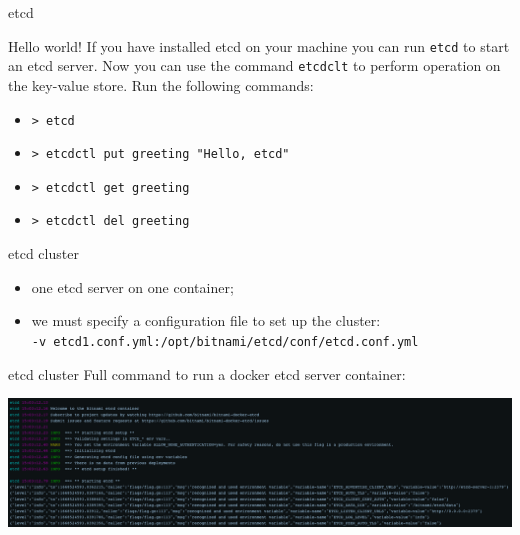 \documentclass[presentation]{beamer}\mode<presentation>{\usetheme{AMSBolognaFC}}
\begin{document}
\begin{frame}[allowframebreaks]{etcd}
    \framebreak
    
    \begin{block}{Hello world!}
        If you have installed etcd on your machine you can run \texttt{etcd} to start an etcd server.
        Now you can use the command \texttt{etcdclt} to perform operation on the key-value store.
        Run the following commands:
        \begin{itemize}
            \item \texttt{> etcd}
            \item \texttt{> etcdctl put greeting "Hello, etcd"}
            \item \texttt{> etcdctl get greeting}
            \item \texttt{> etcdctl del greeting}
        \end{itemize}
    \end{block}
    
    \framebreak
    
    \begin{block}{etcd cluster}
        \begin{itemize}
            \item one etcd server on one container;
            \item we must specify a configuration file to set up the cluster:\\
            \texttt{-v etcd1.conf.yml:/opt/bitnami/etcd/conf/etcd.conf.yml}
        \end{itemize}
        
    \end{block}
    
    \framebreak
    
    \begin{block}{etcd cluster}
        Full command to run a docker etcd server container:\\
        
    \end{block}
    
    \centering
    \includegraphics[width=\textwidth]{figures/docker-run-output.png}
    
\end{frame}
\end{document}
